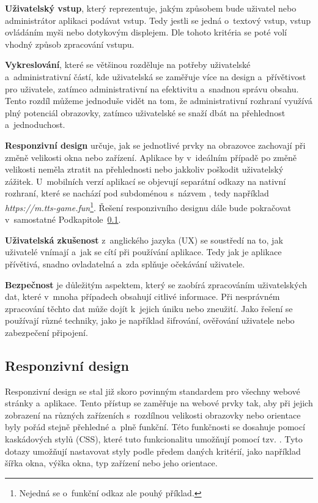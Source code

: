 \begin{description}
    \item \textbf{Uživatelský vstup}, který reprezentuje, jakým způsobem bude uživatel nebo administrátor aplikaci podávat vstup. Tedy jestli se jedná o~textový vstup, vstup ovládáním myši nebo dotykovým displejem. Dle tohoto kritéria se poté volí vhodný způsob zpracování vstupu.
    \item \textbf{Vykreslování}, které se většinou rozděluje na potřeby uživatelské a~administrativní částí, kde uživatelská se zaměřuje více na design a~přívětivost pro uživatele, zatímco administrativní na efektivitu a~snadnou správu obsahu. Tento rozdíl můžeme jednoduše vidět na tom, že administrativní rozhraní využívá plný potenciál obrazovky, zatímco uživatelské se snaží dbát na přehlednost a~jednoduchost.
    \item \textbf{Responzivní design} určuje, jak se jednotlivé prvky na obrazovce zachovají při změně velikosti okna nebo zařízení. Aplikace by v~ideálním případě po změně velikosti neměla ztratit na přehlednosti nebo jakkoliv poškodit uživatelský zážitek. U~mobilních verzí aplikací se objevují separátní odkazy na nativní rozhraní, které se nachází pod subdoménou s~názvem , tedy například \textit{https://m.tts-game.fun}\footnote{Nejedná se o~funkční odkaz ale pouhý příklad.}. Řešení responzivního designu dále bude pokračovat v~samostatné Podkapitole~\ref{subsec:ui-gui-theory-responsive-design}.
    \item \textbf{Uživatelská zkušenost} z~anglického jazyka \textit{} (UX) se soustředí na to, jak uživatelé vnímají a~jak se cítí při používání aplikace. Tedy jak je aplikace přívětivá, snadno ovladatelná a~zda splňuje očekávání uživatele.
    \item \textbf{Bezpečnost} je důležitým aspektem, který se zaobírá zpracováním uživatelských dat, které v~mnoha případech obsahují citlivé informace. Při nesprávném zpracování těchto dat může dojít k~jejich úniku nebo zneužití. Jako řešení se používají různé techniky, jako je například šifrování, ověřování uživatele nebo zabezpečení připojení.
\end{description}

\subsection{Responzivní design}
\label{subsec:ui-gui-theory-responsive-design}
Responzivní design se stal již skoro povinným standardem pro všechny webové stránky a~aplikace. Tento přístup se zaměřuje na webové prvky tak, aby při jejich zobrazení na různých zařízeních s~rozdílnou velikosti obrazovky nebo orientace byly pořád stejně přehledné a~plně funkční. Této funkčnosti se dosahuje pomocí kaskádových stylů (CSS), které tuto funkcionalitu umožňují pomocí tzv. \textit{}. Tyto dotazy umožňují nastavovat styly podle předem daných kritérií, jako například šířka okna, výška okna, typ zařízení nebo jeho orientace.

